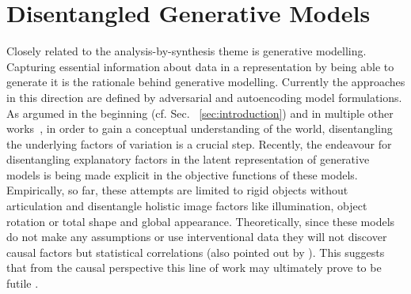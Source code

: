 \section{Disentangled Generative Models}
	Closely related to the analysis-by-synthesis theme is generative modelling.
	Capturing essential information about data in a representation by being able to generate it is the rationale behind generative modelling.
	Currently the approaches in this direction are defined by adversarial \cite{goodfellow16dlb} and autoencoding \cite{kingma13vae} model formulations.
	As argumed in the beginning (cf. Sec. ~\ref{sec:introduction}) and in multiple other works~\cite{desjardins12genentangle, bengio13rep, chen16infogan, higgins16betavae, eastwood18disquantify}, in order to gain a conceptual understanding of the world, disentangling the underlying factors of variation is a crucial step.
	Recently, the endeavour for disentangling explanatory factors in the latent representation of generative models is being made explicit in the objective functions \cite{burgess18betavae, chen16infogan, higgins16betavae} of these models.
	Empirically, so far, these attempts are limited to rigid objects without articulation and disentangle holistic image factors like illumination, object rotation or total shape and global appearance.
	Theoretically, since these models do not make any assumptions or use interventional data they will not discover causal factors but statistical correlations (also pointed out by \cite{li18analogy}).
	This suggests that from the causal perspective this line of work may ultimately prove to be futile \cite{locatello18challenging}.


